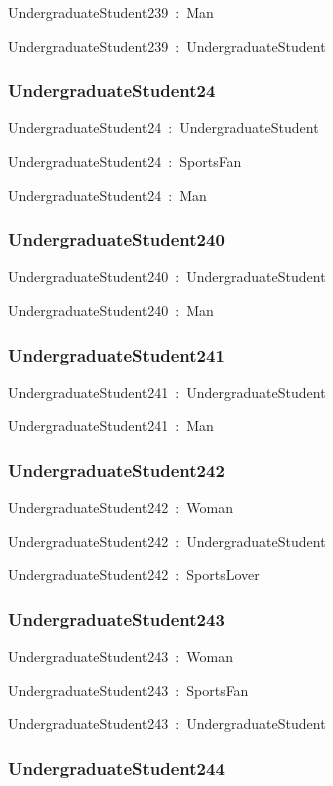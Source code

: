 \documentclass{article}
\begin{document}
UndergraduateStudent239~:~Man

UndergraduateStudent239~:~UndergraduateStudent

\subsubsection*{UndergraduateStudent24}

UndergraduateStudent24~:~UndergraduateStudent

UndergraduateStudent24~:~SportsFan

UndergraduateStudent24~:~Man

\subsubsection*{UndergraduateStudent240}

UndergraduateStudent240~:~UndergraduateStudent

UndergraduateStudent240~:~Man

\subsubsection*{UndergraduateStudent241}

UndergraduateStudent241~:~UndergraduateStudent

UndergraduateStudent241~:~Man

\subsubsection*{UndergraduateStudent242}

UndergraduateStudent242~:~Woman

UndergraduateStudent242~:~UndergraduateStudent

UndergraduateStudent242~:~SportsLover

\subsubsection*{UndergraduateStudent243}

UndergraduateStudent243~:~Woman

UndergraduateStudent243~:~SportsFan

UndergraduateStudent243~:~UndergraduateStudent

\subsubsection*{UndergraduateStudent244}
\end{document}
